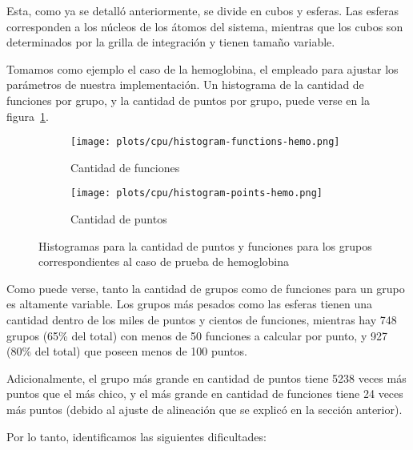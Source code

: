 Esta, como ya se detall\'o anteriormente, se divide en cubos y
esferas. Las esferas corresponden a los n\'ucleos de los \'atomos del sistema,
mientras que los cubos son determinados por la grilla de integraci\'on y tienen tama\~no
variable.

Tomamos como ejemplo el caso de la hemoglobina, el empleado para ajustar los
par\'ametros de nuestra implementaci\'on. Un histograma de la cantidad de
funciones por grupo, y la cantidad de puntos por grupo, puede verse en la
figura~\ref{fig:lio-histo-groups}.

\begin{figure}[htbp]
   \centering
   \begin{subfigure}[b]{\plotwidthtres}
     \texttt{[image: plots/cpu/histogram-functions-hemo.png]}
     \caption{Cantidad de funciones}
   \end{subfigure}
   \begin{subfigure}[b]{\plotwidthtres}
     \texttt{[image: plots/cpu/histogram-points-hemo.png]}
     \caption{Cantidad de puntos}
   \end{subfigure}
   \caption{Histogramas para la cantidad de puntos y funciones para los grupos correspondientes al caso de prueba
   de hemoglobina}
   \label{fig:lio-histo-groups}
\end{figure}

Como puede verse, tanto la cantidad de grupos como de funciones para un grupo es altamente
variable. Los grupos m\'as pesados como las esferas tienen una cantidad dentro de los
miles de puntos y cientos de funciones, mientras hay 748 grupos (65\%
del total) con menos de 50 funciones a calcular por punto, y 927 (80\% del total)
que poseen menos de 100 puntos.

Adicionalmente, el grupo m\'as grande en cantidad de puntos tiene 5238 veces m\'as
puntos que el m\'as chico, y el m\'as grande en cantidad de funciones tiene 24
veces m\'as puntos (debido al ajuste de alineaci\'on que se explic\'o en la
secci\'on anterior).

Por lo tanto, identificamos las siguientes dificultades:

